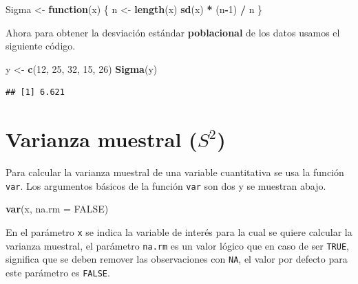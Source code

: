 \documentclass[10pt,]{krantz}
\makeatletter
\newenvironment{Shaded}{\begin{snugshade}}{\end{snugshade}}
\newcommand{\KeywordTok}[1]{\textcolor[rgb]{0.13,0.29,0.53}{\textbf{#1}}}
\newcommand{\DataTypeTok}[1]{\textcolor[rgb]{0.13,0.29,0.53}{#1}}
\newcommand{\DecValTok}[1]{\textcolor[rgb]{0.00,0.00,0.81}{#1}}
\newcommand{\StringTok}[1]{\textcolor[rgb]{0.31,0.60,0.02}{#1}}
\newcommand{\OtherTok}[1]{\textcolor[rgb]{0.56,0.35,0.01}{#1}}
\newcommand{\ControlFlowTok}[1]{\textcolor[rgb]{0.13,0.29,0.53}{\textbf{#1}}}
\newcommand{\OperatorTok}[1]{\textcolor[rgb]{0.81,0.36,0.00}{\textbf{#1}}}
\newcommand{\NormalTok}[1]{#1}
\newenvironment{kframe}{%
\medskip{}
\setlength{\fboxsep}{.8em}
 \def\at@end@of@kframe{}%
 \ifinner\ifhmode%
  \def\at@end@of@kframe{\end{minipage}}%
  \begin{minipage}{\columnwidth}%
 \fi\fi%
 \def\FrameCommand##1{\hskip\@totalleftmargin \hskip-\fboxsep
 \colorbox{shadecolor}{##1}\hskip-\fboxsep
     \hskip-\linewidth \hskip-\@totalleftmargin \hskip\columnwidth}%
 \MakeFramed {\advance\hsize-\width
   \@totalleftmargin\z@ \linewidth\hsize
   \@setminipage}}%
 {\par\unskip\endMakeFramed%
 \at@end@of@kframe}
\renewenvironment{Shaded}{\begin{kframe}}{\end{kframe}}
\makeatother
\begin{document}
\begin{Shaded}
\begin{Highlighting}[]
\NormalTok{Sigma <-}\StringTok{ }\ControlFlowTok{function}\NormalTok{(x) \{}
\NormalTok{  n <-}\StringTok{ }\KeywordTok{length}\NormalTok{(x)}
  \KeywordTok{sd}\NormalTok{(x) }\OperatorTok{*}\StringTok{ }\NormalTok{(n}\OperatorTok{-}\DecValTok{1}\NormalTok{) }\OperatorTok{/}\StringTok{ }\NormalTok{n}
\NormalTok{\} }
\end{Highlighting}
\end{Shaded}

Ahora para obtener la desviación estándar \textbf{poblacional} de los
datos usamos el siguiente código.

\begin{Shaded}
\begin{Highlighting}[]
\NormalTok{y <-}\StringTok{ }\KeywordTok{c}\NormalTok{(}\DecValTok{12}\NormalTok{, }\DecValTok{25}\NormalTok{, }\DecValTok{32}\NormalTok{, }\DecValTok{15}\NormalTok{, }\DecValTok{26}\NormalTok{)}
\KeywordTok{Sigma}\NormalTok{(y)}
\end{Highlighting}
\end{Shaded}

\begin{verbatim}
## [1] 6.621
\end{verbatim}

\section{\texorpdfstring{Varianza muestral (\(S^2\)) 
}{Varianza muestral (S\^{}2)  }}\label{varianza-muestral-s2}

Para calcular la varianza muestral de una variable cuantitativa se usa
la función \texttt{var}. Los argumentos básicos de la función
\texttt{var} son dos y se muestran abajo.

\begin{Shaded}
\begin{Highlighting}[]
\KeywordTok{var}\NormalTok{(x, }\DataTypeTok{na.rm =} \OtherTok{FALSE}\NormalTok{)}
\end{Highlighting}
\end{Shaded}

En el parámetro \texttt{x} se indica la variable de interés para la cual
se quiere calcular la varianza muestral, el parámetro \texttt{na.rm} es
un valor lógico que en caso de ser \texttt{TRUE}, significa que se deben
remover las observaciones con \texttt{NA}, el valor por defecto para
este parámetro es \texttt{FALSE}.
\end{document}
